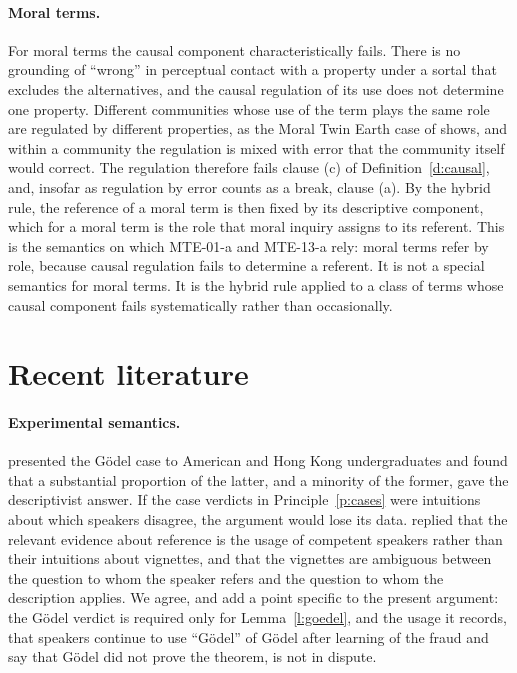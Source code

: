\documentclass{situationist-preprint}
\begin{document}
\paragraph{Moral terms.} For moral terms the causal component characteristically fails. There is no grounding of \enquote{wrong} in perceptual contact with a property under a sortal that excludes the alternatives, and the causal regulation of its use does not determine one property. Different communities whose use of the term plays the same role are regulated by different properties, as the Moral Twin Earth case of \citet{HorganTimmons1991} shows, and within a community the regulation is mixed with error that the community itself would correct. The regulation therefore fails clause (c) of Definition~\ref{d:causal}, and, insofar as regulation by error counts as a break, clause (a). By the hybrid rule, the reference of a moral term is then fixed by its descriptive component, which for a moral term is the role that moral inquiry assigns to its referent. This is the semantics on which MTE-01-a and MTE-13-a rely: moral terms refer by role, because causal regulation fails to determine a referent. It is not a special semantics for moral terms. It is the hybrid rule applied to a class of terms whose causal component fails systematically rather than occasionally.

\section{Recent literature}

\paragraph{Experimental semantics.} \citet{Machery2004} presented the G\"odel case to American and Hong Kong undergraduates and found that a substantial proportion of the latter, and a minority of the former, gave the descriptivist answer. If the case verdicts in Principle~\ref{p:cases} were intuitions about which speakers disagree, the argument would lose its data. \citet{Devitt2011} replied that the relevant evidence about reference is the usage of competent speakers rather than their intuitions about vignettes, and that the vignettes are ambiguous between the question to whom the speaker refers and the question to whom the description applies. We agree, and add a point specific to the present argument: the G\"odel verdict is required only for Lemma~\ref{l:goedel}, and the usage it records, that speakers continue to use \enquote{G\"odel} of G\"odel after learning of the fraud and say that G\"odel did not prove the theorem, is not in dispute.
\end{document}
